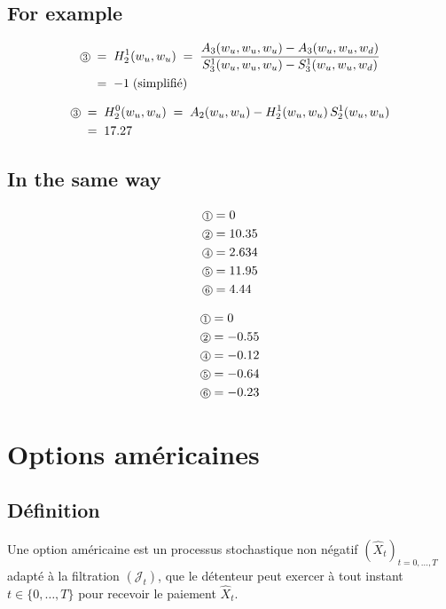 \documentclass[12pt,a4paper]{article}
\numberwithin{equation}{section}
\theoremstyle{plain} %
\theoremstyle{definition} %
\theoremstyle{remark} %
\theoremstyle{myexample}
\theoremstyle{definition}
\newcommand{\circled}[1]{\text{\tikz[baseline=(char.base)]\node[shape=circle,draw,inner sep=0.6pt] (char) {\scriptsize #1};}}
\begin{document}
\subsection*{For example}

\begin{align*}
\circled{3}\; &=\; H_2^{1}(w_u,w_u)
\;=\; \frac{A_3(w_u,w_u,w_u) - A_3(w_u,w_u,w_d)}{S_3^{1}(w_u,w_u,w_u) - S_3^{1}(w_u,w_u,w_d)}\\
&=\; -1 \;\text{(simplifié)}
\end{align*}

\begin{align*}
\circled{3}\; &=\; H_2^{0}(w_u,w_u)
\;=\; A_2(w_u,w_u) - H_2^{1}(w_u,w_u)\, S_2^{1}(w_u,w_u)\\
&=\; 17.27
\end{align*}

\subsection*{In the same way}

\begin{minipage}{0.45\textwidth}
\begin{align*}
\circled{1} &= 0 \\
\circled{2} &= 10.35 \\
\circled{4} &= 2.634 \\
\circled{5} &= 11.95 \\
\circled{6} &= 4.44
\end{align*}
\end{minipage}
\hfill
\begin{minipage}{0.45\textwidth}
\begin{align*}
\circled{1} &= 0 \\
\circled{2} &= -0.55 \\
\circled{4} &= -0.12 \\
\circled{5} &= -0.64 \\
\circled{6} &= -0.23
\end{align*}
\end{minipage}
\section{Options américaines}

\subsection{Définition}

Une option américaine est un processus stochastique non négatif $(\hat{X}_t)_{t=0,\dots,T}$ adapté à la filtration $(\mathcal{J}_t)$, que le détenteur peut exercer à tout instant $t\in\{0,\dots,T\}$ pour recevoir le paiement $\hat{X}_t$.
\end{document}
